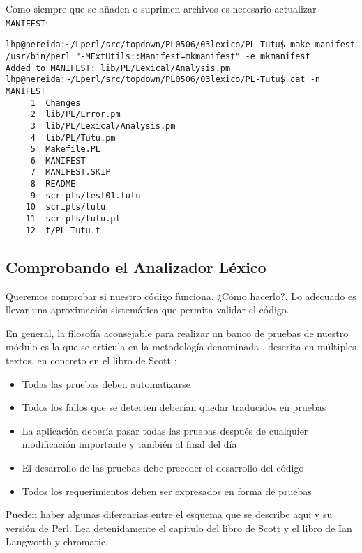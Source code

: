 
Como siempre que se añaden o suprimen archivos es necesario actualizar 
\verb|MANIFEST|:
\begin{verbatim}
lhp@nereida:~/Lperl/src/topdown/PL0506/03lexico/PL-Tutu$ make manifest
/usr/bin/perl "-MExtUtils::Manifest=mkmanifest" -e mkmanifest
Added to MANIFEST: lib/PL/Lexical/Analysis.pm
lhp@nereida:~/Lperl/src/topdown/PL0506/03lexico/PL-Tutu$ cat -n MANIFEST
     1  Changes
     2  lib/PL/Error.pm
     3  lib/PL/Lexical/Analysis.pm
     4  lib/PL/Tutu.pm
     5  Makefile.PL
     6  MANIFEST
     7  MANIFEST.SKIP
     8  README
     9  scripts/test01.tutu
    10  scripts/tutu
    11  scripts/tutu.pl
    12  t/PL-Tutu.t
\end{verbatim}

\subsection{Comprobando el Analizador Léxico}
\label{subsection:tests}
Queremos comprobar si nuestro código funciona. ¿Cómo hacerlo?.
Lo adecuado es llevar una aproximación sistemática que permita validar
el código. 


En general, la filosofía aconsejable para realizar un banco
de pruebas de nuestro módulo es la que se articula en la metodología denominada
, descrita en múltiples textos, en concreto en el 
libro de Scott \cite{scott}:
\begin{itemize}
\item
Todas las pruebas deben automatizarse
\item
Todos los fallos que se detecten deberían quedar traducidos en pruebas
\item
La aplicación debería pasar todas las pruebas después de cualquier modificación
importante y también al final del día
\item
El desarrollo de las pruebas debe preceder el desarrollo 
del código
\item
Todos los requerimientos deben ser expresados en forma de pruebas
\end{itemize}


Pueden haber algunas diferencias entre el esquema que se describe aqui y su versión de Perl.
Lea detenidamente el capítulo 
 del libro de Scott \cite{scott} y el libro \cite{perltesting} de Ian Langworth y chromatic.

